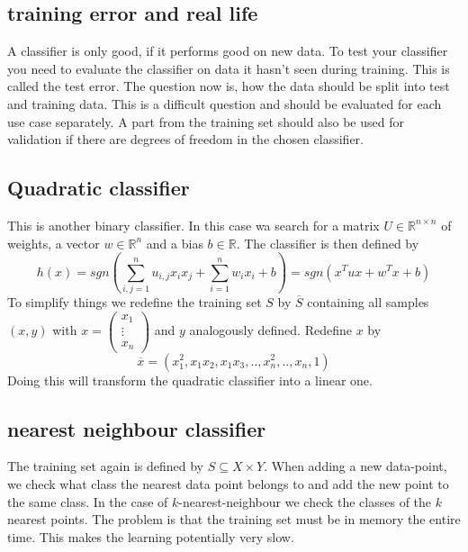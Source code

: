 \documentclass[a4paper, 12pt]{article}
\theoremstyle{plain}
\theoremstyle{definition}
\theoremstyle{lemma}
\theoremstyle{remark}
\theoremstyle{example}
\begin{document}
	\subsection{training error and real life}
	A classifier is only good, if it performs good on new data. To test your classifier you need to evaluate the classifier on data it hasn't seen during training. This is called the test error. The question now is, how the data should be split into test and training data. This is a difficult question and should be evaluated for each use case separately. A part from the training set should also be used for validation if there are degrees of freedom in the chosen classifier.
	
	\subsection{Quadratic classifier}
	This is another binary classifier. In this case wa search for a matrix $U \in \mathbb{R}^{n\times n}$ of weights, a vector $w \in \mathbb{R}^n$ and a bias $b \in \mathbb{R}$. The classifier is then defined by \[h(x) = sgn\left(\sum_{i,j = 1}^{n} u_{i,j}x_ix_j + \sum_{i=1}^{n} w_ix_i + b\right) = sgn(x^Tux + w^Tx + b)\]
	To simplify things we redefine the training set $S$ by $\overline{S}$ containing all samples $(x,y)$ with $x = \begin{pmatrix}
		x_1\\
		\vdots\\
		x_n
	\end{pmatrix}$ and $y$ analogously defined. Redefine $x$ by \[\overline{x} = (x_1^2, x_1x_2, x_1x_3, .., x_n^2,.., x_n,1)\]
	Doing this will transform the quadratic classifier into a linear one.
	
	\subsection{nearest neighbour classifier}
	The training set again is defined by $S \subseteq X\times Y$. When adding a new data-point, we check what class the nearest data point belongs to and add the new point to the same class. In the case of $k$-nearest-neighbour we check the classes of the $k$ nearest points. The problem is that the training set must be in memory the entire time. This makes the learning potentially very slow.
	
\end{document}

